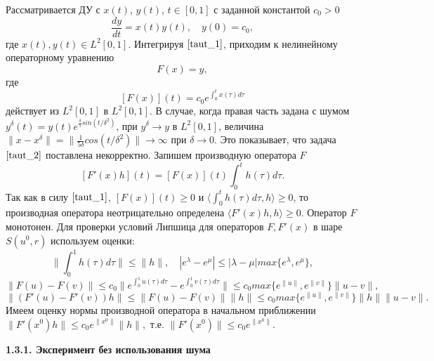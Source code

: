 Рассматривается ДУ с $x(t)$, $y(t)$, $t\in[0, 1]$ с заданной константой $c_0>0$
\begin{equation}\label{taut_1}
\frac{dy}{dt}=x(t)y(t), \quad y(0)=c_0,
\end{equation}
где $x(t), y(t)\in L^2[0,1]$. Интегрируя $\eqref{taut_1}$, приходим к нелинейному операторному уравнению
\begin{equation}\label{taut_2}
F(x)=y,
\end{equation}
где $$[F(x)](t)=c_0 e^{\int_{0}^{t}x(\tau)d\tau}$$
действует из $L^2[0,1]$ в $L^2[0,1]$. В случае, когда правая часть задана с шумом $y^\delta(t)=y(t)e^{\frac{\delta}{5} sin(t/{\delta}^2)}$, при $y^\delta\to y$ в $L^2[0,1]$, величина \\ $\|x-x^\delta\|=\|\frac{1}{5 \delta}cos(t/{\delta}^2)\|\to\infty$ при $\delta\to 0$. Это показывает, что задача $\eqref{taut_2}$ поставлена некорректно. Запишем производную оператора $F$
\begin{equation}\label{taut_3}
[F'(x)h](t)=[F(x)](t)\int_{0}^{t}h(\tau)d\tau.
\end{equation}
Так как в силу $\eqref{taut_1}$, $[F(x)](t)\ge 0$ и $\langle\int_{0}^{t}h(\tau)d\tau, h\rangle\ge 0$, то производная оператора неотрицательно определена $\langle F'(x)h, h\rangle\ge 0$. Оператор $F$ монотонен. Для проверки условий Липшица для операторов $F, F'(x)$ в шаре $S(u^0, r)$ используем оценки: $$\|\int_{0}^{1}h(\tau)d\tau\|\le\|h\|,\quad |e^\lambda-e^\mu|\le|\lambda-\mu|max\{e^\lambda, e^\mu\},$$
$$\|F(u)-F(v)\|\le c_0\|e^{\int_{0}^{1}u(\tau)d\tau}-e^{\int_{0}^{1}v(\tau)d\tau}\|
\le c_0 max\{e^{\|u\|},e^{\|v\|}\}\|u-v\|,$$
$$\|(F'(u)-F'(v))h\|\le\|F(u)-F(v)\|\|h\|\le c_0 max\{e^{\|u\|},e^{\|v\|}\}\|h\|\|u-v\|.$$
Имеем оценку нормы производной оператора в начальном приближении\\ $\|F'(x^0)h\|\le c_0 e^{\|x^0\|}\|h\|,$ т.е. $\|F'(x^0)\|\le c_0 e^{\|x^0\|}$.%

{\bfseries 1.3.1. Эксперимент без использования шума} 

